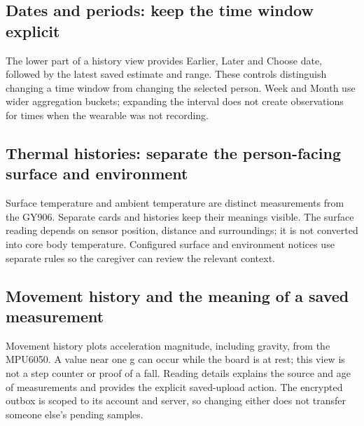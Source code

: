 \clearpage
\subsection{Dates and periods: keep the time window explicit}
The lower part of a history view provides Earlier, Later and Choose date, followed by the latest saved estimate and range. These controls distinguish changing a time window from changing the selected person. Week and Month use wider aggregation buckets; expanding the interval does not create observations for times when the wearable was not recording.


\clearpage
\subsection{Thermal histories: separate the person-facing surface and environment}
Surface temperature and ambient temperature are distinct measurements from the GY906. Separate cards and histories keep their meanings visible. The surface reading depends on sensor position, distance and surroundings; it is not converted into core body temperature. Configured surface and environment notices use separate rules so the caregiver can review the relevant context.


\clearpage
\subsection{Movement history and the meaning of a saved measurement}
Movement history plots acceleration magnitude, including gravity, from the MPU6050. A value near one g can occur while the board is at rest; this view is not a step counter or proof of a fall. Reading details explains the source and age of measurements and provides the explicit saved-upload action. The encrypted outbox is scoped to its account and server, so changing either does not transfer someone else's pending samples.

